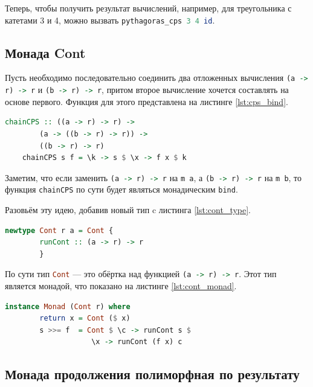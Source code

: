 \documentclass[times]{itmo-student-thesis}
\begin{document}
Теперь, чтобы получить результат вычислений, например, для треугольника с катетами 3 и 4, можно вызвать \lstinline[language=Haskell]{pythagoras_cps 3 4 id}.

\subsection{Монада Cont}\label{sec:cps_monad}

Пусть необходимо последовательно соединить два
отложенных вычисления \lstinline[language=Haskell]{(a -> r) -> r} и \lstinline[language=Haskell]{(b -> r) -> r}, 
притом второе вычисление хочется составлять на основе первого. Функция для этого представлена на листинге \ref{lst:cps_bind}.

\begin{lstlisting}[language=Haskell,float=!h,caption={Соединение отложенных вычислений},label={lst:cps_bind}]
    chainCPS :: ((a -> r) -> r) -> 
        (a -> ((b -> r) -> r)) -> 
        ((b -> r) -> r)
    chainCPS s f = \k -> s $ \x -> f x $ k
\end{lstlisting}

Заметим, что если заменить \lstinline[language=Haskell]{(a -> r) -> r} на \lstinline[language=Haskell]{m a}, а 
\lstinline[language=Haskell]{(b -> r) -> r} на \lstinline[language=Haskell]{m b}, то функция \lstinline[language=Haskell]{chainCPS}
по сути будет являться монадическим \lstinline[language=Haskell]{bind}.

Разовьём эту идею, добавив новый тип c листинга \ref{lst:cont_type}.

\begin{lstlisting}[language=Haskell,float=!h,caption={Тип Cont},label={lst:cont_type}]
    newtype Cont r a = Cont { 
        runCont :: (a -> r) -> r 
        }
\end{lstlisting}

По сути тип \lstinline[language=Haskell]{Cont} --- это обёртка над функцией \lstinline[language=Haskell]{(a -> r) -> r}.
Этот тип является монадой, что показано на листинге \ref{lst:cont_monad}.

\begin{lstlisting}[language=Haskell,float=!h,caption={Включение типа Cont в класс Monad},label={lst:cont_monad}]
    instance Monad (Cont r) where
        return x = Cont ($ x)
        s >>= f  = Cont $ \c -> runCont s $ 
                    \x -> runCont (f x) c
\end{lstlisting}

\subsection{Монада продолжения полиморфная по результату}\label{sec:poly_cont_monad}
\end{document}
